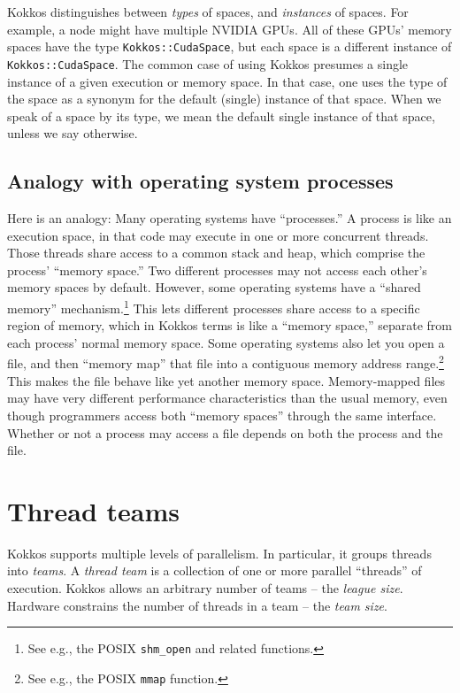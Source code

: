 Kokkos distinguishes between \emph{types} of spaces, and \emph{instances} of spaces.
For example, a node might have multiple NVIDIA GPUs.
All of these GPUs' memory spaces have the type \lstinline!Kokkos::CudaSpace!,
but each space is a different instance of \lstinline!Kokkos::CudaSpace!.
The common case of using Kokkos presumes a single instance of a given execution or memory space.
In that case, one uses the type of the space as a synonym for the default (single) instance of that space.
When we speak of a space by its type,
we mean the default single instance of that space,
unless we say otherwise.

\subsection{Analogy with operating system processes}\label{SS:Model:Spaces:Analogies}

Here is an analogy: Many operating systems have ``processes.''
A process is like an execution space, in that code may execute in one or more concurrent threads.
Those threads share access to a common stack and heap, which comprise the process' ``memory space.''
Two different processes may not access each other's memory spaces by default.
However, some operating systems have a ``shared memory'' mechanism.\footnote{See e.g., the POSIX \lstinline!shm_open! and related functions.}
This lets different processes share access to a specific region of memory,
which in Kokkos terms is like a ``memory space,'' separate from each process' normal memory space.
Some operating systems also let you open a file,
and then ``memory map'' that file into a contiguous memory address range.\footnote{See e.g., the POSIX \lstinline!mmap! function.}
This makes the file behave like yet another memory space.
Memory-mapped files may have very different performance characteristics than the usual memory,
even though programmers access both ``memory spaces'' through the same interface.
Whether or not a process may access a file depends on both the process and the file.


\section{Thread teams}\label{S:Model:Teams}

Kokkos supports multiple levels of parallelism.
In particular, it groups threads into \emph{teams}.
A \emph{thread team} is a collection of one or more parallel ``threads'' of execution.
Kokkos allows an arbitrary number of teams -- the \emph{league size}.
Hardware constrains the number of threads in a team -- the \emph{team size}.

